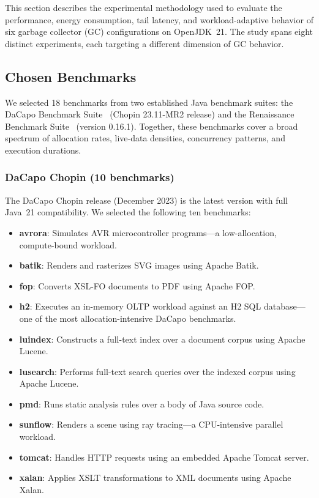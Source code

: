 

This section describes the experimental methodology used to evaluate the performance, energy consumption, tail latency, and workload-adaptive behavior of six garbage collector (GC) configurations on OpenJDK~21. The study spans eight distinct experiments, each targeting a different dimension of GC behavior.

\subsection{Chosen Benchmarks}

We selected 18 benchmarks from two established Java benchmark suites: the DaCapo Benchmark Suite~\cite{blackburn2006dacapo,blackburn2006dacapo_tr} (Chopin 23.11-MR2 release) and the Renaissance Benchmark Suite~\cite{prokopec2019renaissance} (version 0.16.1). Together, these benchmarks cover a broad spectrum of allocation rates, live-data densities, concurrency patterns, and execution durations.

\subsubsection{DaCapo Chopin (10 benchmarks)}

The DaCapo Chopin release (December 2023) is the latest version with full Java~21 compatibility. We selected the following ten benchmarks:

\begin{itemize}
\item \textbf{avrora}: Simulates AVR microcontroller programs---a low-allocation, compute-bound workload.
\item \textbf{batik}: Renders and rasterizes SVG images using Apache Batik.
\item \textbf{fop}: Converts XSL-FO documents to PDF using Apache FOP.
\item \textbf{h2}: Executes an in-memory OLTP workload against an H2 SQL database---one of the most allocation-intensive DaCapo benchmarks.
\item \textbf{luindex}: Constructs a full-text index over a document corpus using Apache Lucene.
\item \textbf{lusearch}: Performs full-text search queries over the indexed corpus using Apache Lucene.
\item \textbf{pmd}: Runs static analysis rules over a body of Java source code.
\item \textbf{sunflow}: Renders a scene using ray tracing---a CPU-intensive parallel workload.
\item \textbf{tomcat}: Handles HTTP requests using an embedded Apache Tomcat server.
\item \textbf{xalan}: Applies XSLT transformations to XML documents using Apache Xalan.
\end{itemize}

